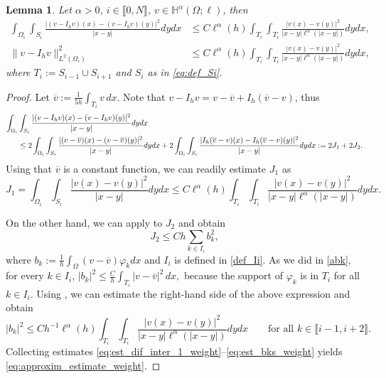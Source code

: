 \documentclass[11 pt]{article}
\newcommand\inter[1]{\llbracket #1\rrbracket}
\newtheorem{lemma}[theorem]{Lemma}
\numberwithin{equation}{section}
\newcommand{\weH}[1]{\mathbb H^{#1}(\Omega;\ell)}
\begin{document}
\begin{lemma}\label{lem:stab_dif_interp_weight}
Let $\alpha>0$, $i\in\inter{0,N}$, $v\in \weH{\alpha}$, then
\begin{align}
    \int_{\Omega_i}\int_{S_i}\frac{|(v-I_h v)(x)-(v-I_h v)(y)|^2}{|x-y|}dy dx &\leq C  \ell^{\alpha}(h)\int_{T_i}\int_{T_{i}}\frac{|v(x)-v(y)|^2}{|x-y|\ell^{\alpha}(|x-y|)}dy dx, \label{eq:approxim_estimate_weight}\\
    \|v-I_h v\|_{L^2(\Omega_i)}^2&\leq C\ell^{\alpha}(h)\int_{T_{i}}\int_{T_{i}}\frac{|v(x)-v(y)|^2}{|x-y|\ell^{\alpha}(|x-y|)}dy dx,\label{a4}
\end{align}
where $T_i:=S_{i-1}\cup S_{i+1}$ and $S_i$ as in \eqref{eq:def_Si}.
\end{lemma}
%
\begin{proof}
Let $\overline{v}:=\frac{1}{5h}\int_{T_{i}} v\, dx$. Note that $v-I_h v=v-\overline{v}+I_h(\overline v - v)$, thus
%
\begin{align}\notag
    \int_{\Omega_i}&\int_{S_i}\frac{|(v-I_h v)(x)-(v-I_h v)(y)|^2}{|x-y|} dy dx \\
    &\leq 2\int_{\Omega_i}\int_{S_i}\frac{|(v-\overline{v})(x)-(v-\overline{v})(y)|^2}{|x-y|}dy dx + 2 \int_{\Omega_i}\int_{S_i}\frac{|I_h(\overline v-{v})(x)-I_h(\overline v-{v})(y)|^2}{|x-y|}dy dx :=2J_1+2J_2.\label{eq:est_dif_inter_1_weight}
\end{align}
%
Using that $\overline v$ is a constant function, we can readily estimate $J_1$ as
%
\begin{equation}\label{eq:est_J1_weight}
    J_1 = \int_{\Omega_i}\int_{S_i}\frac{|v(x)-v(y)|^2}{|x-y|}dy dx \leq C\ell^{\alpha}(h)\int_{T_i}\int_{T_i}\frac{|v(x)-v(y)|^2}{|x-y|\ell^{\alpha}(|x-y|)}dy dx.
\end{equation}

On the other hand, we can apply  to $J_2$ and obtain
%
\begin{equation}\label{eq:est_J2_weight}
    J_2 \leq Ch\sum_{k\in I_i} b_k^2,
\end{equation}
%
where $b_k:=\frac{1}{h}\int_{\Omega}(v-\overline v)\varphi_k dx$ and $I_i$ is defined in \eqref{def_Ii}. As we did in \eqref{abk}, for every $k\in I_i$, $
    |b_k|^2\leq \frac{C}{h}\int_{T_{i}}|v-\overline{v}|^2\, dx,$ because the support of $\varphi_k$ is in $T_{i}$ for all $k\in I_i$. Using , we can estimate the right-hand side of the above expression and obtain
%
\begin{equation}\label{eq:est_bks_weight}
    |b_k|^2\leq Ch^{-1}\ell^{\alpha}(h)\int_{T_{i}}\int_{T_{i}}\frac{|v(x)-v(y)|^2}{|x-y|\ell^{\alpha}(|x-y|)}dy dx\qquad \text{for all $k\in \inter{i-1,i+2}$}.
\end{equation}
%
Collecting estimates \eqref{eq:est_dif_inter_1_weight}--\eqref{eq:est_bks_weight} yields \eqref{eq:approxim_estimate_weight}. 


\end{proof}
\end{document}
